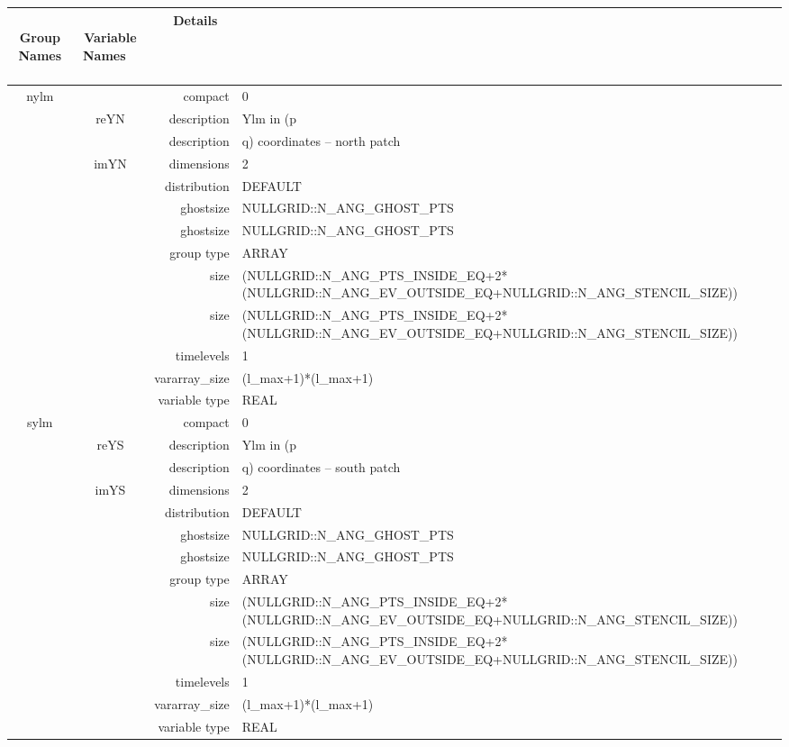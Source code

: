 \begin{tabular*}{150mm}{|c|c@{\extracolsep{\fill}}|rl|} \hline 
~ {\bf Group Names} ~ & ~ {\bf Variable Names} ~  &{\bf Details} ~ & ~\\ 
\hline 
nylm &  & compact & 0 \\ 
 & reYN & description & Ylm in (p \\ 
& ~ & description & q) coordinates -- north patch \\ 
 & imYN & dimensions & 2 \\ 
 &  & distribution & DEFAULT \\ 
 &  & ghostsize & NULLGRID::N\_ANG\_GHOST\_PTS \\ 
& ~ & ghostsize & NULLGRID::N\_ANG\_GHOST\_PTS \\ 
 &  & group type & ARRAY \\ 
 &  & size & (NULLGRID::N\_ANG\_PTS\_INSIDE\_EQ+2*(NULLGRID::N\_ANG\_EV\_OUTSIDE\_EQ+NULLGRID::N\_ANG\_STENCIL\_SIZE)) \\ 
& ~ & size & (NULLGRID::N\_ANG\_PTS\_INSIDE\_EQ+2*(NULLGRID::N\_ANG\_EV\_OUTSIDE\_EQ+NULLGRID::N\_ANG\_STENCIL\_SIZE)) \\ 
 &  & timelevels & 1 \\ 
 &  & vararray\_size & (l\_max+1)*(l\_max+1) \\ 
 &  & variable type & REAL \\ 
\hline 
sylm &  & compact & 0 \\ 
 & reYS & description & Ylm in (p \\ 
& ~ & description & q) coordinates -- south patch \\ 
 & imYS & dimensions & 2 \\ 
 &  & distribution & DEFAULT \\ 
 &  & ghostsize & NULLGRID::N\_ANG\_GHOST\_PTS \\ 
& ~ & ghostsize & NULLGRID::N\_ANG\_GHOST\_PTS \\ 
 &  & group type & ARRAY \\ 
 &  & size & (NULLGRID::N\_ANG\_PTS\_INSIDE\_EQ+2*(NULLGRID::N\_ANG\_EV\_OUTSIDE\_EQ+NULLGRID::N\_ANG\_STENCIL\_SIZE)) \\ 
& ~ & size & (NULLGRID::N\_ANG\_PTS\_INSIDE\_EQ+2*(NULLGRID::N\_ANG\_EV\_OUTSIDE\_EQ+NULLGRID::N\_ANG\_STENCIL\_SIZE)) \\ 
 &  & timelevels & 1 \\ 
 &  & vararray\_size & (l\_max+1)*(l\_max+1) \\ 
 &  & variable type & REAL \\ 
\hline 

\end{tabular*}
